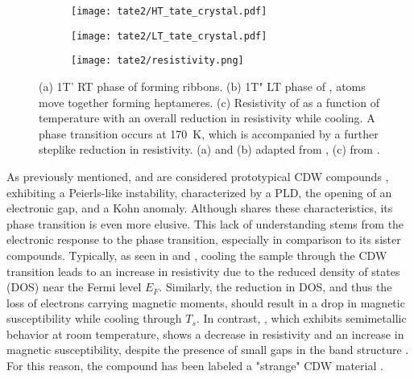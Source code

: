 \begin{figure}
	\centering
	\begin{subfigure}[b]{0.3\textwidth}
		\texttt{[image: tate2/HT\_tate\_crystal.pdf]}
		\caption{}
	\end{subfigure}
	\hfill
	\begin{subfigure}[b]{0.3\textwidth}
		\texttt{[image: tate2/LT\_tate\_crystal.pdf]}
		\caption{}
	\end{subfigure}
	\hfill
	\begin{subfigure}[b]{0.3\textwidth}
		\texttt{[image: tate2/resistivity.png]}
		\caption{}
	\end{subfigure}
	\caption{(a) 1T' RT phase of  forming ribbons. (b) 1T" LT phase of ,  atoms move together forming heptameres. (c) Resistivity of  as a function of temperature with an overall reduction in resistivity while cooling. A phase transition occurs at \qty{170}{\kelvin}, which is accompanied by a further steplike reduction in resistivity. (a) and (b) adapted from \cite{lin_evidence_2022}, (c) from \cite{hu_optical_2022}.}
	\label{fig:tate_structure}
\end{figure}

As previously mentioned,  and  are considered prototypical CDW compounds \cite{bozin_crystallization_2023, shen_precursor_2023}, exhibiting a Peierls-like instability, characterized by a PLD, the opening of an electronic gap, and a Kohn anomaly.
Although  shares these characteristics, its phase transition is even more elusive.
This lack of understanding stems from the electronic response to the phase transition, especially in comparison to its  sister compounds.
Typically, as seen in  and , cooling the sample through the CDW transition leads to an increase in resistivity due to the reduced density of states (DOS) near the Fermi level $E_F$.
Similarly, the reduction in DOS, and thus the loss of electrons carrying magnetic moments, should result in a drop in magnetic susceptibility while cooling through $T_s$.
In contrast, , which exhibits semimetallic behavior at room temperature, shows a decrease in resistivity and an increase in magnetic susceptibility, despite the presence of small gaps in the band structure \cite{sorgel_new_2006,hu_optical_2022,lin_evidence_2022}.
For this reason, the compound has been labeled a "strange" CDW material \cite{lin_evidence_2022}.

